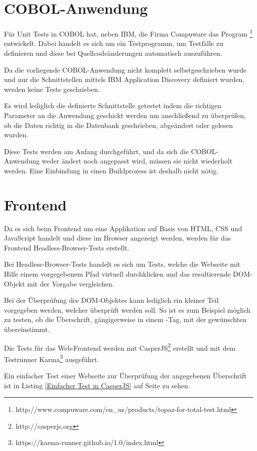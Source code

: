 \section{COBOL-Anwendung}
Für Unit Tests in COBOL hat, neben IBM, die Firma Compuware das Program
\footnote{http://www.compuware.com/en\_us/products/topaz-for-total-test.html} entwickelt.
Dabei handelt es sich um ein Testprogramm, um Testfälle zu definieren und diese bei Quellcodeänderungen automatisch
auszuführen.

Da die vorliegende COBOL-Anwendung nicht komplett selbstgeschrieben wurde und nur die Schnittstellen mittels IBM Application
Discovery definiert wurden, werden keine Tests geschrieben.

Es wird lediglich die definierte Schnittstelle getestet indem die richtigen Parameter an die Anwendung geschickt werden
um anschließend zu überprüfen, ob die Daten richtig in die Datenbank geschrieben, abgeändert oder gelesen wurden.

Diese Tests werden am Anfang durchgeführt, und da sich die COBOL-Anwendung weder ändert noch angepasst wird, müssen sie
nicht wiederholt werden. Eine Einbindung in einen Buildprozess ist deshalb nicht nötig.

\section{Frontend}
Da es sich beim Frontend um eine Applikation auf Basis von HTML, CSS und JavaScript handelt und diese im Browser angezeigt
werden, werden für das Frontend Headless-Browser-Tests erstellt.

Bei Headless-Browser-Tests handelt es sich um Tests, welche die Webseite mit Hilfe einem vorgegebenem Pfad virtuell
durchklicken und das resultierende DOM-Objekt mit der Vorgabe vergleichen.

Bei der Überprüfung des DOM-Objektes kann lediglich ein kleiner Teil vorgegeben werden, welcher überprüft werden soll. So
ist es zum Beispiel möglich zu testen, ob die Überschrift, gängigerweise in einem -Tag, mit der gewünschten
übereinstimmt.

Die Tests für das Web-Frontend werden mit CasperJS\footnote{http://casperjs.org} erstellt und mit dem Testrunner
Karma\footnote{https://karma-runner.github.io/1.0/index.html} ausgeführt.

Ein einfacher Test einer Webseite zur Überprüfung der angegebenen Überschrift ist in Listing
\ref{Einfacher Test in CasperJS} auf Seite \pageref{Einfacher Test in CasperJS} zu sehen.

